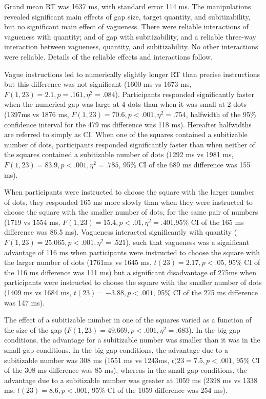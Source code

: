 \documentclass[doc,floatmark]{apa}
\begin{document}
Grand mean RT was 1637 ms, with standard error 114 ms. The manipulations revealed significant main effects of gap size, target quantity, and subitizability, but no significant main effect of vagueness. There were reliable interactions of vagueness with quantity; and of gap with subitizability, and a reliable three-way interaction between vagueness, quantity, and subitizability. No other interactions were reliable. Details of the reliable effects and interactions follow. 

Vague instructions led to numerically slightly longer RT than precise instructions but this difference was not significant (1600 ms vs 1673 ms, $F(1,23)=2.1, p = .161,  \eta^2 =.084$). Participants responded significantly faster when the numerical gap was large at 4 dots than when it was small at 2 dots (1397ms vs 1876 ms, $F(1,23)=70.6, p<.001, \eta^2 = .754$, halfwidth of the 95\% confidence interval for the 479 ms difference was 118 ms). Hereafter halfwidths are referred to simply as CI. When one of the squares contained a subitizable number of dots, participants responded significantly  faster than when neither of the squares contained a subitizable number of dots (1292 ms vs 1981 ms, $F(1,23)=83.9, p<.001, \eta^2 =.785$, 95\% CI of the 689 ms difference was 155 ms).

When participants were instructed to choose the square with the larger number of dots, they responded 165 ms more slowly than when they were instructed to choose the square with the smaller number of dots, for the same pair of numbers (1719 vs 1554 ms, $F(1,23)=15.4, p<.01,  \eta^2 =.401$,95\% CI of the 165 ms difference was 86.5 ms). Vagueness interacted significantly with quantity ($F(1,23)=25.065,p<.001,\eta^2=.521$), such that vagueness was a significant advantage of 116 ms when participants were instructed to choose the square with the larger number of dots (1761ms vs 1645 ms, $t(23)=2.17,p<.05$, 95\% CI of the 116 ms difference was 111 ms) but a significant disadvantage of 275ms when participants were instructed to choose the square with the smaller number of dots (1409 ms vs 1684 ms, $t(23)=-3.88, p < .001$, 95\% CI of the 275 ms difference was 147 ms).

The effect of a subitizable number in one of the squares varied as a function of the size of the gap ($F(1,23)=49.669,p<.001,\eta^2=.683$). In the big gap conditions, the advantage for a subitizable number was smaller than it was in the small gap conditions. In the big gap conditions, the advantage due to a subitizable number was 308 ms (1551 ms vs 1243ms, $t(23=7.5, p<.001$, 95\% CI of the 308 ms difference was 85 ms), whereas in the small gap conditions, the advantage due to a subitizable number was greater at 1059 ms (2398 ms vs 1338 ms, $t(23) = 8.6, p<.001$, 95\% CI of the 1059 difference was 254 ms).
\end{document}
